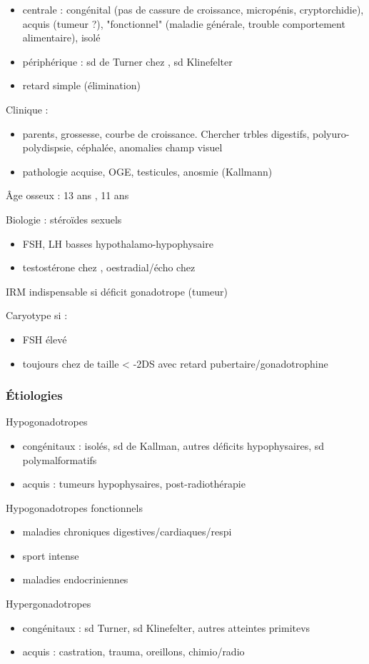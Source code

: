 \documentclass[11pt]{article}
\begin{document}
\begin{itemize}
\item centrale : congénital (pas de cassure de croissance, micropénis,
cryptorchidie), acquis (tumeur ?), "fonctionnel" (maladie générale, trouble
comportement alimentaire), isolé
\item périphérique : sd de Turner chez \female, sd Klinefelter \male
\item retard simple (élimination)
\end{itemize}

Clinique : 
\begin{itemize}
\item parents, grossesse, courbe de croissance. Chercher trbles digestifs, polyuro-polydispsie, céphalée, anomalies champ visuel
\item pathologie acquise, OGE, testicules, anosmie (Kallmann)
\end{itemize}

Âge osseux : 13 ans \male, 11 ans \female

Biologie : stéroïdes sexuels
\begin{itemize}
\item FSH, LH basses \thus hypothalamo-hypophysaire
\item testostérone chez \male, oestradial/écho chez \female
\end{itemize}

IRM indispensable si déficit gonadotrope (tumeur) \danger

Caryotype si :
\begin{itemize}
\item FSH élevé
\item toujours chez \female{} de taille < -2DS avec retard pubertaire/gonadotrophine \inc
\end{itemize}

\subsubsection{Étiologies}
\label{sec:org9b022df}
Hypogonadotropes
\begin{itemize}
\item congénitaux : isolés, sd de Kallman, autres déficits hypophysaires, sd
polymalformatifs
\item acquis : tumeurs hypophysaires, post-radiothérapie
\end{itemize}
Hypogonadotropes fonctionnels
\begin{itemize}
\item maladies chroniques digestives/cardiaques/respi
\item sport intense
\item maladies endocriniennes
\end{itemize}
Hypergonadotropes
\begin{itemize}
\item congénitaux : sd Turner, sd Klinefelter, autres atteintes primitevs
\item acquis : castration, trauma, oreillons, chimio/radio
\end{itemize}
\end{document}
